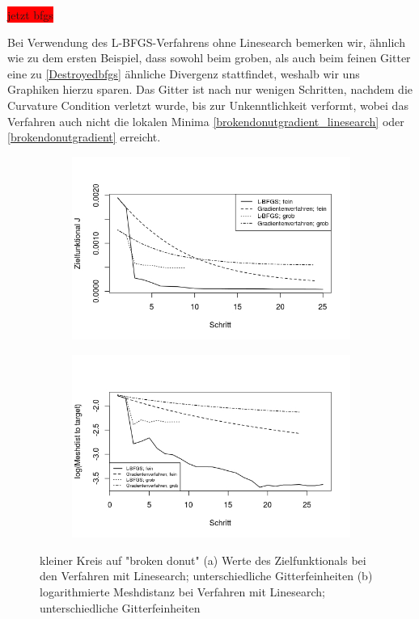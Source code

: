 \colorbox{red}{jetzt bfgs}

Bei Verwendung des L-BFGS-Verfahrens ohne Linesearch bemerken wir, ähnlich wie zu dem ersten Beispiel, dass sowohl beim groben, als auch beim feinen Gitter eine zu \ref{Destroyedbfgs} ähnliche Divergenz stattfindet, weshalb wir uns Graphiken hierzu sparen. Das Gitter ist nach nur wenigen Schritten, nachdem die Curvature Condition verletzt wurde, bis zur Unkenntlichkeit verformt, wobei das Verfahren auch nicht die lokalen Minima \ref{brokendonutgradient_linesearch} oder \ref{brokendonutgradient} erreicht. 

\begin{figure}
	\begin{subfigure}{0.5\textwidth}
	\centering
	\includegraphics[scale=0.48]{plot_donut_target.jpeg}
	\caption{}	
	\end{subfigure}
	\begin{subfigure}{0.5\textwidth}
	\centering
	\includegraphics[scale=0.48]{plot_donut_meshdist.jpeg}
	\caption{}	
	\end{subfigure}
\caption{kleiner Kreis auf "broken donut" (a) Werte des Zielfunktionals bei den Verfahren mit Linesearch; unterschiedliche Gitterfeinheiten (b) logarithmierte Meshdistanz bei Verfahren mit Linesearch; unterschiedliche Gitterfeinheiten}
\label{plot_konvergenzdonut}
\end{figure}

